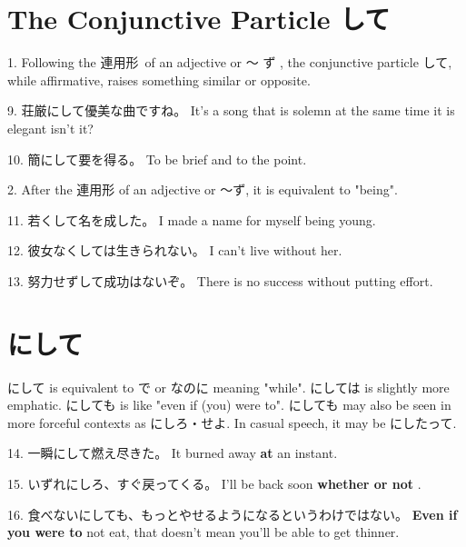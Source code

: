 \section{The Conjunctive Particle して}
 
\par{1. Following the 連用形 of an adjective or ～ ず , the conjunctive particle して, while affirmative, raises something similar or opposite. }

\par{9. 荘厳にして優美な曲ですね。 \hfill\break
It's a song that is solemn at the same time it is elegant isn't it? }

\par{10. 簡にして要を得る。 \hfill\break
To be brief and to the point. }

\par{2. After the 連用形 of an adjective or ～ず, it is equivalent to "being". }

\par{11. 若くして名を成した。 \hfill\break
I made a name for myself being young. }

\par{12. 彼女なくしては生きられない。 \hfill\break
I can't live without her. }

\par{13. 努力せずして成功はないぞ。 \hfill\break
There is no success without putting effort. }
      
\section{にして}
 
\par{ にして is equivalent to で or なのに meaning "while". にしては is slightly more emphatic. にしても is like "even if (you) were to". にしても may also be seen in more forceful contexts as にしろ・せよ. In casual speech, it may be にしたって. }

\par{14. 一瞬にして燃え尽きた。 \hfill\break
It burned away \textbf{at }an instant. }

\par{15. いずれにしろ、すぐ戻ってくる。 \hfill\break
I'll be back soon \textbf{whether or not }. }

\par{16. 食べないにしても、もっとやせるようになるというわけではない。 \hfill\break
\textbf{Even if you were to }not eat, that doesn't mean you'll be able to get thinner. }

